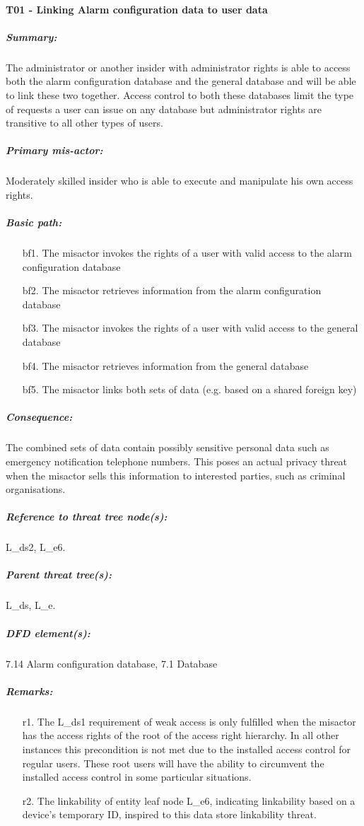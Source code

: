

\paragraph{T01 - Linking Alarm configuration data to user data}
    \subparagraph{Summary:} The administrator or another insider with administrator rights is able to access both the alarm configuration database and 
the general database and will be able to link these two together. Access control to both these databases limit the type of requests a user can issue on any database but administrator rights are transitive to all other types of users.
    \subparagraph{Primary mis-actor:} Moderately skilled insider who is able to execute and manipulate his own access rights.
    \subparagraph{Basic path:}
    \begin{enumerate}
        \item[bf1.]{The misactor invokes the rights of a user with valid access to the alarm configuration database }
        \item[bf2.]{The misactor retrieves information from the alarm configuration database}
        \item[bf3.]{The misactor invokes the rights of a user with valid access to the general database}
	\item[bf4.]{The misactor retrieves information from the general database}
	\item[bf5.]{The misactor links both sets of data (e.g. based on a shared foreign key)}
    \end{enumerate}
    \subparagraph{Consequence:} The combined sets of data contain possibly sensitive personal data such as emergency notification telephone numbers. This poses an actual privacy threat when the misactor sells this information to interested parties, such as criminal organisations.

    \subparagraph{Reference to threat tree node(s):} L\_ds2, L\_e6.
    \subparagraph{Parent threat tree(s):} L\_ds, L\_e.
    \subparagraph{DFD element(s):} 7.14 Alarm configuration database, 7.1 Database 
    \subparagraph{Remarks:}
    \begin{enumerate}
         \item[r1.] The L\_ds1 requirement of weak access is only fulfilled when the misactor has
	the access rights of the root of the access right hierarchy. In all other instances this precondition is not met due to the installed access control for regular users. These root users will have the ability to circumvent the installed access control in some particular situations. 
         \item[r2.] The linkability of entity leaf node L\_e6, indicating linkability based on a device's temporary ID, inspired to this data store linkability threat.
     \end{enumerate}



